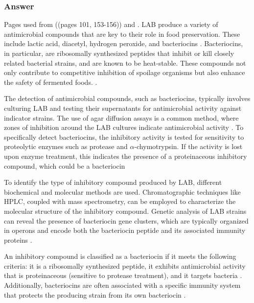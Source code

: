 \subsubsection*{Answer}
Pages used from \cite*{L3-LAB} ((pages 101, 153-156)) and \cite*{L8-MicroInFood}.
LAB produce a variety of antimicrobial compounds that are key to their role in food preservation. These include lactic acid, diacetyl, hydrogen peroxide, and bacteriocins \cite*{L3-LAB}. Bacteriocins, in particular, are ribosomally synthesized peptides that inhibit or kill closely related bacterial strains, and are known to be heat-stable. These compounds not only contribute to competitive inhibition of spoilage organisms but also enhance the safety of fermented foods. \cite*{L3-LAB}.

The detection of antimicrobial compounds, such as bacteriocins, typically involves culturing LAB and testing their supernatants for antimicrobial activity against indicator strains. The use of agar diffusion assays is a common method, where zones of inhibition around the LAB cultures indicate antimicrobial activity \cite*{L3-LAB}. To specifically detect bacteriocins, the inhibitory activity is tested for sensitivity to proteolytic enzymes such as protease and $\alpha$-chymotrypsin. If the activity is lost upon enzyme treatment, this indicates the presence of a proteinaceous inhibitory compound, which could be a bacteriocin \cite*{L3-LAB}

To identify the type of inhibitory compound produced by LAB, different biochemical and molecular methods are used. Chromatographic techniques like HPLC, coupled with mass spectrometry, can be employed to characterize the molecular structure of the inhibitory compound. Genetic analysis of LAB strains can reveal the presence of bacteriocin gene clusters, which are typically organized in operons and encode both the bacteriocin peptide and its associated immunity proteins \cite*{L3-LAB}.

An inhibitory compound is classified as a bacteriocin if it meets the following criteria: it is a ribosomally synthesized peptide, it exhibits antimicrobial activity that is proteinaceous (sensitive to protease treatment), and it targets bacteria \cite*{L3-LAB}. Additionally, bacteriocins are often associated with a specific immunity system that protects the producing strain from its own bacteriocin \cite*{L3-LAB}.


